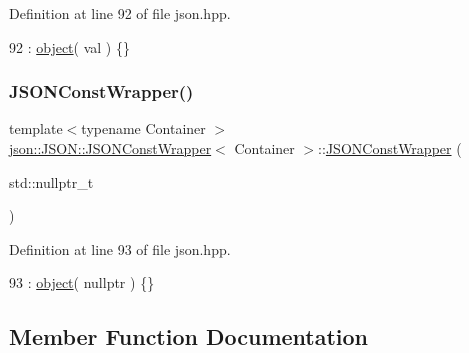 Definition at line 92 of file json.\+hpp.


\begin{DoxyCode}
92 : \mbox{\hyperlink{classjson_1_1_j_s_o_n_1_1_j_s_o_n_const_wrapper_a945ba0baef716a60327d5e4b871f9a42}{object}}( val ) \{\}
\end{DoxyCode}
\mbox{\label{classjson_1_1_j_s_o_n_1_1_j_s_o_n_const_wrapper_a15614ff604d50f98bea39d340c6905fe}} 
\subsubsection{\texorpdfstring{J\+S\+O\+N\+Const\+Wrapper()}{JSONConstWrapper()}\hspace{0.1cm}{\footnotesize\ttfamily [2/2]}}
{\footnotesize\ttfamily template$<$typename Container $>$ \\
\mbox{\hyperlink{classjson_1_1_j_s_o_n_1_1_j_s_o_n_const_wrapper}{json\+::\+J\+S\+O\+N\+::\+J\+S\+O\+N\+Const\+Wrapper}}$<$ Container $>$\+::\mbox{\hyperlink{classjson_1_1_j_s_o_n_1_1_j_s_o_n_const_wrapper}{J\+S\+O\+N\+Const\+Wrapper}} (\begin{DoxyParamCaption}\item[{std\+::nullptr\+\_\+t}]{ }\end{DoxyParamCaption})\hspace{0.3cm}{\ttfamily [inline]}}



Definition at line 93 of file json.\+hpp.


\begin{DoxyCode}
93 : \mbox{\hyperlink{classjson_1_1_j_s_o_n_1_1_j_s_o_n_const_wrapper_a945ba0baef716a60327d5e4b871f9a42}{object}}( \textcolor{keyword}{nullptr} ) \{\}
\end{DoxyCode}


\subsection{Member Function Documentation}
\mbox{\label{classjson_1_1_j_s_o_n_1_1_j_s_o_n_const_wrapper_a29924543b1e49e7114d542de0a70a2d0}} 
